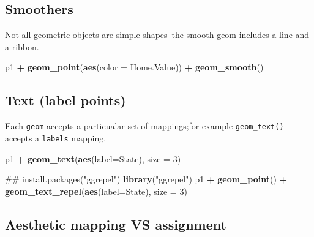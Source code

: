 \documentclass[]{book}
\newenvironment{Shaded}{\begin{snugshade}}{\end{snugshade}}
\newcommand{\KeywordTok}[1]{\textcolor[rgb]{0.13,0.29,0.53}{\textbf{#1}}}
\newcommand{\DataTypeTok}[1]{\textcolor[rgb]{0.13,0.29,0.53}{#1}}
\newcommand{\DecValTok}[1]{\textcolor[rgb]{0.00,0.00,0.81}{#1}}
\newcommand{\StringTok}[1]{\textcolor[rgb]{0.31,0.60,0.02}{#1}}
\newcommand{\OperatorTok}[1]{\textcolor[rgb]{0.81,0.36,0.00}{\textbf{#1}}}
\newcommand{\NormalTok}[1]{#1}
\begin{document}
\subsection{Smoothers}\label{smoothers}

Not all geometric objects are simple shapes--the smooth geom includes a
line and a ribbon.

\begin{Shaded}
\begin{Highlighting}[]
\NormalTok{p1 }\OperatorTok{+}
\StringTok{  }\KeywordTok{geom_point}\NormalTok{(}\KeywordTok{aes}\NormalTok{(}\DataTypeTok{color =}\NormalTok{ Home.Value)) }\OperatorTok{+}
\StringTok{  }\KeywordTok{geom_smooth}\NormalTok{()}
\end{Highlighting}
\end{Shaded}

\subsection{Text (label points)}\label{text-label-points}

Each \texttt{geom} accepts a particualar set of mappings;for example
\texttt{geom\_text()} accepts a \texttt{labels} mapping.

\begin{Shaded}
\begin{Highlighting}[]
\NormalTok{p1 }\OperatorTok{+}\StringTok{ }
\StringTok{  }\KeywordTok{geom_text}\NormalTok{(}\KeywordTok{aes}\NormalTok{(}\DataTypeTok{label=}\NormalTok{State), }\DataTypeTok{size =} \DecValTok{3}\NormalTok{)}
\end{Highlighting}
\end{Shaded}

\begin{Shaded}
\begin{Highlighting}[]
\NormalTok{## install.packages("ggrepel") }
\KeywordTok{library}\NormalTok{(}\StringTok{"ggrepel"}\NormalTok{)}
\NormalTok{p1 }\OperatorTok{+}\StringTok{ }
\StringTok{  }\KeywordTok{geom_point}\NormalTok{() }\OperatorTok{+}\StringTok{ }
\StringTok{  }\KeywordTok{geom_text_repel}\NormalTok{(}\KeywordTok{aes}\NormalTok{(}\DataTypeTok{label=}\NormalTok{State), }\DataTypeTok{size =} \DecValTok{3}\NormalTok{)}
\end{Highlighting}
\end{Shaded}

\subsection{Aesthetic mapping VS
assignment}\label{aesthetic-mapping-vs-assignment}
\end{document}
